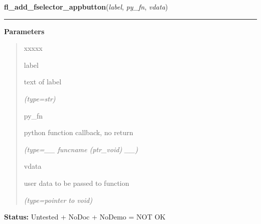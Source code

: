     \vspace{0.5ex}

\hspace{.8\funcindent}\begin{boxedminipage}{\funcwidth}

    \raggedright \textbf{fl\_add\_fselector\_appbutton}(\textit{label}, \textit{py\_fn}, \textit{vdata})

    \vspace{-1.5ex}

    \rule{\textwidth}{0.5\fboxrule}
\setlength{\parskip}{2ex}
\setlength{\parskip}{1ex}
      \textbf{Parameters}
      \vspace{-1ex}

      \begin{quote}
        \begin{Ventry}{xxxxx}

          \item[label]

          text of label

            {\it (type=str)}

          \item[py\_fn]

          python function callback, no return

            {\it (type=\_\_ funcname (ptr\_void) \_\_)}

          \item[vdata]

          user data to be passed to function

            {\it (type=pointer to void)}

        \end{Ventry}

      \end{quote}

\textbf{Status:} Untested + NoDoc + NoDemo = NOT OK



    \end{boxedminipage}

    \label{xformslib:flgoodies:fl_remove_fselector_appbutton}

    \vspace{0.5ex}

